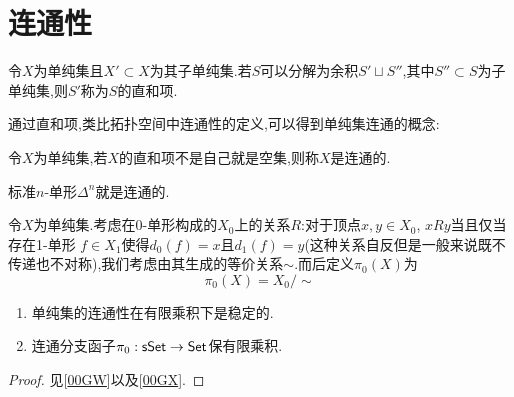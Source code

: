 \section{连通性}
\begin{definition}[直和项]
    令$X$为单纯集且$X'\subset X$为其子单纯集.若$S$可以分解为余积$S' \sqcup S''$,其中$S''\subset S$为子单纯集,则$S'$称为$S$的直和项.
\end{definition}
通过直和项,类比拓扑空间中连通性的定义,可以得到单纯集连通的概念:
\begin{definition}
    令$X$为单纯集,若$X$的直和项不是自己就是空集,则称$X$是连通的.
\end{definition}
\begin{example}
    标准$n$-单形$\Delta^n$就是连通的.
\end{example}
\begin{definition}[连通分支]
    令$X$为单纯集.考虑在$0$-单形构成的$X_0$上的关系$R$:对于顶点$x,y\in X_0$, $xRy$当且仅当存在1-单形 $f\in X_1$使得$d_0(f) = x$且$d_1(f) = y$(这种关系自反但是一般来说既不传递也不对称),我们考虑由其生成的等价关系$\sim$.而后定义$\pi_0(X)$为
    \[
        \pi_0(X) = X_0/\sim
    \]
\end{definition}
\begin{proposition}\label{命题:连通性}
    \begin{enumerate}
        \item 单纯集的连通性在有限乘积下是稳定的.
        \item 连通分支函子$\pi_0 : \mathsf{sSet} \to \mathsf{Set}$保有限乘积.
    \end{enumerate}
\end{proposition}
\begin{proof}
    见\cite{Kerodon}[\href{https://kerodon.net/tag/00GW}{00GW}]以及[\href{https://kerodon.net/tag/00GX}{00GX}].
\end{proof}
